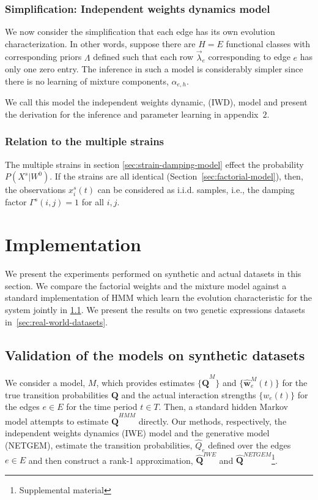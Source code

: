\documentclass{bioinfo}
\begin{document}
\begin{methods}
\subsubsection{Simplification: Independent weights dynamics model}
\label{sec:relat-indep-weights}
We now consider the simplification that each edge has its own
evolution characterization. In other words, suppose there are $H=E$
functional classes with corresponding priors $\Lambda$ defined such
that each row $\vec{\lambda}_{e}$ corresponding to edge $e$ has only
one zero entry. The inference in such a model is considerably simpler
since there is no learning of mixture components, $\alpha_{e,h}$. 

We call this model the independent weights dynamic, (IWD), model and
present the derivation for the inference and parameter learning in
appendix~$2$. %

\subsubsection{Relation to the multiple strains}
The multiple strains in section \ref{sec:strain-damping-model} effect the probability $P(X^{s} | W^{0})$. If the strains are all identical (Section~\ref{sec:factorial-model}),
then, the observations $x^{s}_{i}(t)$ can be considered as
i.i.d. samples, i.e., the damping factor $\Gamma^{s}(i,j) = 1$ for all
$i, j$. 

\end{methods}

\section{Implementation}
\label{sec:experiments}
We present the experiments performed on synthetic and actual datasets
in this section. We compare the factorial weights and the mixture
model against a standard implementation of HMM which learn
the evolution characteristic for the system jointly in
\ref{sec:validation}. We present the results on two genetic
expressions datasets in~\ref{sec:real-world-datasets}.
  
\subsection{Validation of the models on synthetic datasets}
\label{sec:validation}

We consider a model, $M$, which provides estimates $\{\hat{\mathbf Q}^{M}\}$ and
  $\{\hat{{\mathbf w}}_{e}^{M}(t)\}$  for the true transition probabilities
  $\mathbf{Q} $ and the actual interaction strengths $\{w_{e}(t)\}$ for the
  edges $e\in E$ for the time period $t \in T$. Then, a standard
  hidden Markov model attempts to estimate $\hat{\mathbf Q}^{HMM}$
  directly. Our methods, respectively, the independent weights dynamics (IWE)
  model and the generative model (NETGEM), estimate the transition
  probabilities, $\hat{Q}_{e}$ defined over the edges $e\in E$ and
  then construct a rank-1 approximation, $\hat{\mathbf Q}^{IWE}$ and
  $\hat{\mathbf Q}^{NETGEM}$\footnote{Supplemental material}.
\end{document}

